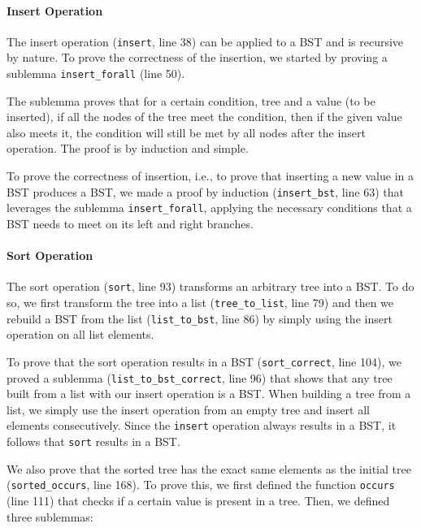 \documentclass[a4paper]{article}
\begin{document}
\paragraph{Insert Operation}

The insert operation (\texttt{insert}, line 38) can be applied to a BST and is recursive by nature. To prove the correctness of the insertion, we started by proving a sublemma \texttt{insert\_forall} (line 50).

The sublemma proves that for a certain condition, tree and a value (to be inserted), if all the nodes of the tree meet the condition, then if the given value also meets it, the condition will still be met by all nodes after the insert operation. The proof is by induction and simple.

To prove the correctness of insertion, i.e., to prove that inserting a new value in a BST produces a BST, we made a proof by induction (\texttt{insert\_bst}, line 63) that leverages the sublemma \texttt{insert\_forall}, applying the necessary conditions that a BST needs to meet on its left and right branches.

\paragraph{Sort Operation}

The sort operation (\texttt{sort}, line 93) transforms an arbitrary tree into a BST. To do so, we first transform the tree into a list (\texttt{tree\_to\_list}, line 79) and then we rebuild a BST from the list (\texttt{list\_to\_bst}, line 86) by simply using the insert operation on all list elements.

To prove that the sort operation results in a BST (\texttt{sort\_correct}, line 104), we proved a sublemma (\texttt{list\_to\_bst\_correct}, line 96) that shows that any tree built from a list with our insert operation is a BST. When building a tree from a list, we simply use the insert operation from an empty tree and insert all elements consecutively. Since the \texttt{insert} operation always results in a BST, it follows that \texttt{sort} results in a BST.

We also prove that the sorted tree has the exact same elements as the initial tree (\texttt{sorted\_occurs}, line 168). To prove this, we first defined the function \texttt{occurs} (line 111) that checks if a certain value is present in a tree. Then, we defined three sublemmas:
\end{document}
